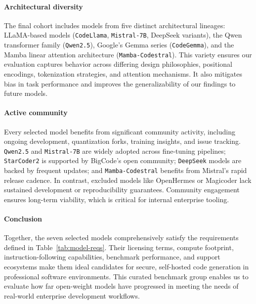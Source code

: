 \paragraph{Architectural diversity}
The final cohort includes models from five distinct architectural lineages: LLaMA-based models (\texttt{CodeLlama}, \texttt{Mistral-7B}, DeepSeek variants), the Qwen transformer family (\texttt{Qwen2.5}), Google’s Gemma series (\texttt{CodeGemma}), and the Mamba linear attention architecture (\texttt{Mamba-Codestral}). This variety ensures our evaluation captures behavior across differing design philosophies, positional encodings, tokenization strategies, and attention mechanisms. It also mitigates bias in task performance and improves the generalizability of our findings to future models.

\paragraph{Active community}
Every selected model benefits from significant community activity, including ongoing development, quantization forks, training insights, and issue tracking. \texttt{Qwen2.5} and \texttt{Mistral-7B} are widely adopted across fine-tuning pipelines; \texttt{StarCoder2} is supported by BigCode’s open community; \texttt{DeepSeek} models are backed by frequent updates; and \texttt{Mamba-Codestral} benefits from Mistral’s rapid release cadence. In contrast, excluded models like OpenHermes or Magicoder lack sustained development or reproducibility guarantees. Community engagement ensures long-term viability, which is critical for internal enterprise tooling.

\paragraph{Conclusion}
Together, the seven selected models comprehensively satisfy the requirements defined in Table~\ref{tab:model-reqs}. Their licensing terms, compute footprint, instruction-following capabilities, benchmark performance, and support ecosystems make them ideal candidates for secure, self-hosted code generation in professional software environments. This curated benchmark group enables us to evaluate how far open-weight models have progressed in meeting the needs of real-world enterprise development workflows.
